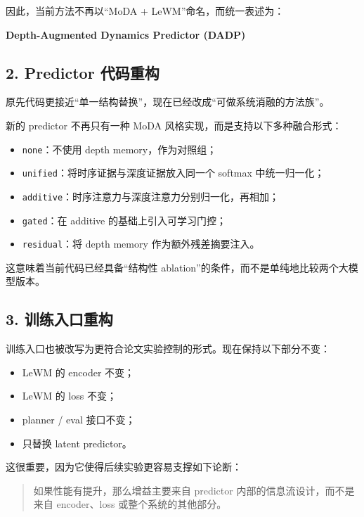 \documentclass[UTF8,a4paper,11pt]{ctexart}
\begin{document}
因此，当前方法不再以“MoDA + LeWM”命名，而统一表述为：

\begin{center}
\textbf{Depth-Augmented Dynamics Predictor (DADP)}
\end{center}

\subsection{2. Predictor 代码重构}

原先代码更接近“单一结构替换”，现在已经改成“可做系统消融的方法族”。

新的 predictor 不再只有一种 MoDA 风格实现，而是支持以下多种融合形式：

\begin{itemize}[leftmargin=2em]
  \item \texttt{none}：不使用 depth memory，作为对照组；
  \item \texttt{unified}：将时序证据与深度证据放入同一个 softmax 中统一归一化；
  \item \texttt{additive}：时序注意力与深度注意力分别归一化，再相加；
  \item \texttt{gated}：在 additive 的基础上引入可学习门控；
  \item \texttt{residual}：将 depth memory 作为额外残差摘要注入。
\end{itemize}

这意味着当前代码已经具备“结构性 ablation”的条件，而不是单纯地比较两个大模型版本。

\subsection{3. 训练入口重构}

训练入口也被改写为更符合论文实验控制的形式。现在保持以下部分不变：

\begin{itemize}[leftmargin=2em]
  \item LeWM 的 encoder 不变；
  \item LeWM 的 loss 不变；
  \item planner / eval 接口不变；
  \item 只替换 latent predictor。
\end{itemize}

这很重要，因为它使得后续实验更容易支撑如下论断：

\begin{quote}
如果性能有提升，那么增益主要来自 predictor 内部的信息流设计，而不是来自 encoder、loss 或整个系统的其他部分。
\end{quote}
\end{document}
